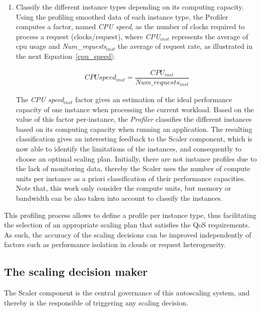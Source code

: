 \begin{enumerate}
\item Classify the different instance types depending on its computing capacity. Using the profiling smoothed data of each instance type, the Profiler computes a factor, named \emph{CPU speed}, as the number of clocks required to process a request (clocks/request), where \emph{CPU$_{inst}$} represents the average of cpu usage and \emph{Num\_requests$_{inst}$} the average of request rate, as illustrated in the next Equation~\ref{cpu_speed}:

\begin{equation}\label{cpu_speed}
\begin{split}
CPU speed_{inst} = \dfrac{  CPU_{inst} } {Num\_requests_{inst} } 
\end{split}
\end{equation}


The \emph{CPU speed$_{inst}$} factor gives an estimation of the ideal performance capacity of one instance when processing the current workload. Based on the value of this factor per-instance, the \emph{Profiler} classifies the different instances based on its computing capacity when running an application. The resulting classification gives an interesting feedback to the Scaler component, which is now able to identify the limitations of the instances, and consequently to choose an optimal scaling plan. Initially, there are not instance profiles due to the lack of monitoring data, thereby the Scaler uses the number of compute units per instance as a priori classification of their performance capacities. Note that, this work only consider the compute units, but memory or bandwidth can be also taken into account to classify the instances.

\end{enumerate}

This profiling process allows to define a profile per instance type, thus facilitating the selection of an appropriate scaling plan that satisfies the QoS requirements. As such, the accuracy of the scaling decisions can be improved independently of factors such as performance isolation in clouds or request heterogeneity.


\subsection{The scaling decision maker}

The Scaler component is the central governance of this autoscaling system, and thereby is the responsible of triggering any scaling decision.

